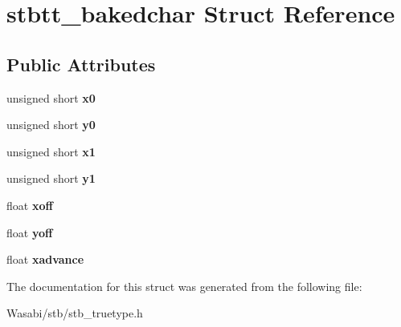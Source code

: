\hypertarget{structstbtt__bakedchar}{}\section{stbtt\+\_\+bakedchar Struct Reference}
\label{structstbtt__bakedchar}
\subsection*{Public Attributes}
\begin{DoxyCompactItemize}
\item 
unsigned short {\bfseries x0}\hypertarget{structstbtt__bakedchar_a8011a0ed0410de9fa405c9cb1ab43da2}{}\label{structstbtt__bakedchar_a8011a0ed0410de9fa405c9cb1ab43da2}

\item 
unsigned short {\bfseries y0}\hypertarget{structstbtt__bakedchar_aec4def12c086e0038ba32ff33ee78644}{}\label{structstbtt__bakedchar_aec4def12c086e0038ba32ff33ee78644}

\item 
unsigned short {\bfseries x1}\hypertarget{structstbtt__bakedchar_a72c22c32abde95a5ba02925b8bd892bf}{}\label{structstbtt__bakedchar_a72c22c32abde95a5ba02925b8bd892bf}

\item 
unsigned short {\bfseries y1}\hypertarget{structstbtt__bakedchar_ac831dc667f6c39b5d22740c6cbd5bc3f}{}\label{structstbtt__bakedchar_ac831dc667f6c39b5d22740c6cbd5bc3f}

\item 
float {\bfseries xoff}\hypertarget{structstbtt__bakedchar_a0708a6588a2768b68a3ae59002944b7c}{}\label{structstbtt__bakedchar_a0708a6588a2768b68a3ae59002944b7c}

\item 
float {\bfseries yoff}\hypertarget{structstbtt__bakedchar_aba01393e52d1c6f4ce86a8b51e498bb4}{}\label{structstbtt__bakedchar_aba01393e52d1c6f4ce86a8b51e498bb4}

\item 
float {\bfseries xadvance}\hypertarget{structstbtt__bakedchar_ad77b35d1a849d9eb7edb91df05b10536}{}\label{structstbtt__bakedchar_ad77b35d1a849d9eb7edb91df05b10536}

\end{DoxyCompactItemize}


The documentation for this struct was generated from the following file\+:\begin{DoxyCompactItemize}
\item 
Wasabi/stb/stb\+\_\+truetype.\+h\end{DoxyCompactItemize}
